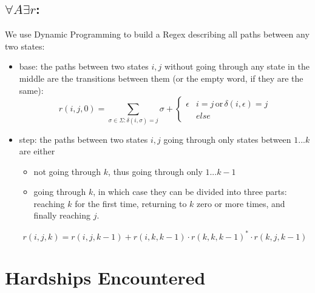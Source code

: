 \documentclass[]{article}
\begin{document}
\begin{itemize}
\begin{itemize}
\begin{center}
		\end{center}
	\end{itemize}
\end{itemize}
\subsection{$\forall A \exists r$:}
We use Dynamic Programming to build a Regex describing all paths between any two states:
\begin{itemize}
	\item 
	base: the paths between two states $i,j$ without going through any state in the middle are the transitions  between them (or the empty word, if they are the same):
	$$r(i,j,0) = \sum_{\sigma \in \Sigma: \delta(i, \sigma) = j} \sigma + \begin{cases}
		\epsilon & i = j \,\text{or}\, \delta(i, \epsilon) = j\\
		&else
	\end{cases}$$
	\item 
	step: the paths between two states $i,j$ going through only states between $1...k$ are either
	\begin{itemize}
		\item 
		not going through $k$, thus going through only $1...k-1$
		\item 
		going through $k$, in which case they can be divided into three parts: reaching $k$ for the first time, returning to $k$ zero or more times, and finally reaching $j$.
	\end{itemize}
	$$r(i,j,k) = r(i,j,k-1) + r(i,k,k-1) \cdot r(k,k,k-1)^* \cdot r(k,j,k-1)$$
\end{itemize}
\section{Hardships Encountered}
\end{document}
